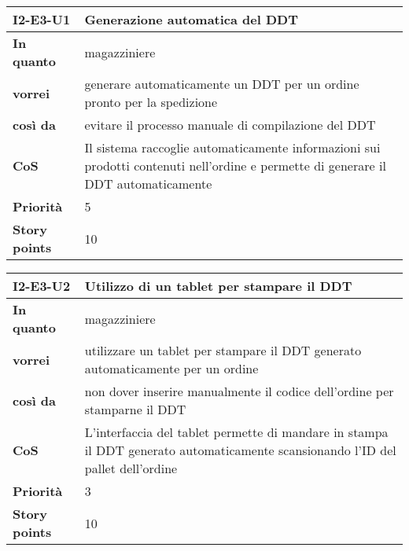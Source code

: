 \begin{table}[H]
  \begin{tabularx}{\textwidth}{lX}
    \toprule
    \textbf{I2-E3-U1} & \textbf{Generazione automatica del DDT} \\
    \midrule
    \textbf{In quanto} & magazziniere \\
    \textbf{vorrei} & generare automaticamente un DDT per un ordine pronto per la spedizione \\
    \textbf{così da} & evitare il processo manuale di compilazione del DDT \\
    \midrule
    \textbf{CoS} & Il sistema raccoglie automaticamente informazioni sui prodotti contenuti nell'ordine e permette di generare il DDT automaticamente \\
    \midrule
    \textbf{Priorità} & 5 \\
    \textbf{Story points} & 10 \\
    \bottomrule
  \end{tabularx}
  \label{user-story:i2-e3-u1}
\end{table}

\begin{table}[H]
  \begin{tabularx}{\textwidth}{lX}
    \toprule
    \textbf{I2-E3-U2} & \textbf{Utilizzo di un tablet per stampare il DDT} \\
    \midrule
    \textbf{In quanto} & magazziniere \\
    \textbf{vorrei} & utilizzare un tablet per stampare il DDT generato automaticamente per un ordine \\
    \textbf{così da} & non dover inserire manualmente il codice dell'ordine per stamparne il DDT \\
    \midrule
    \textbf{CoS} & L'interfaccia del tablet permette di mandare in stampa il DDT generato automaticamente scansionando l'ID del pallet dell'ordine \\
    \midrule
    \textbf{Priorità} & 3 \\
    \textbf{Story points} & 10 \\
    \bottomrule
  \end{tabularx}
  \label{user-story:i2-e3-u2}
\end{table}

